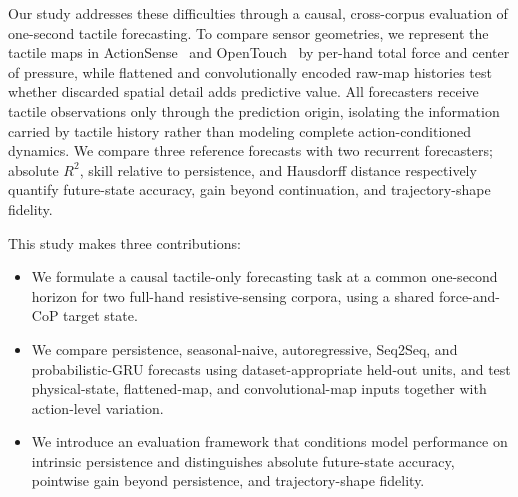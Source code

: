 \documentclass[letterpaper, 10 pt, conference]{ieeeconf}
\newcommand{\Rtwo}{R^{2}}
\begin{document}
Our study addresses these difficulties through a causal, cross-corpus evaluation of one-second tactile forecasting. To compare sensor geometries, we represent the tactile maps in ActionSense~\cite{delpreto2022actionsense} and OpenTouch~\cite{song2025opentouch} by per-hand total force and center of pressure, while flattened and convolutionally encoded raw-map histories test whether discarded spatial detail adds predictive value. All forecasters receive tactile observations only through the prediction origin, isolating the information carried by tactile history rather than modeling complete action-conditioned dynamics. We compare three reference forecasts with two recurrent forecasters; absolute $\Rtwo$, skill relative to persistence, and Hausdorff distance respectively quantify future-state accuracy, gain beyond continuation, and trajectory-shape fidelity.

This study makes three contributions:
\begin{itemize}
    \item We formulate a causal tactile-only forecasting task at a common one-second horizon for two full-hand resistive-sensing corpora, using a shared force-and-CoP target state.
    \item We compare persistence, seasonal-naive, autoregressive, Seq2Seq, and probabilistic-GRU forecasts using dataset-appropriate held-out units, and test physical-state, flattened-map, and convolutional-map inputs together with action-level variation.
    \item We introduce an evaluation framework that conditions model performance on intrinsic persistence and distinguishes absolute future-state accuracy, pointwise gain beyond persistence, and trajectory-shape fidelity.
\end{itemize}
\end{document}
